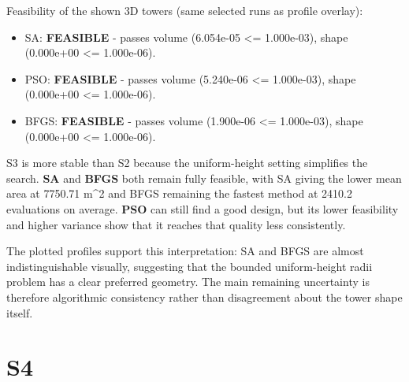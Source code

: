 Feasibility of the shown 3D towers (same selected runs as profile overlay):

\begin{itemize}
\item SA: \textbf{FEASIBLE} - passes volume (6.054e-05 <= 1.000e-03), shape (0.000e+00 <= 1.000e-06).
\item PSO: \textbf{FEASIBLE} - passes volume (5.240e-06 <= 1.000e-03), shape (0.000e+00 <= 1.000e-06).
\item BFGS: \textbf{FEASIBLE} - passes volume (1.900e-06 <= 1.000e-03), shape (0.000e+00 <= 1.000e-06).
\end{itemize}

S3 is more stable than S2 because the uniform-height setting simplifies the search. \textbf{SA} and \textbf{BFGS} both remain fully feasible, with SA giving the lower mean area at 7750.71 m\textasciicircum{}2 and BFGS remaining the fastest method at 2410.2 evaluations on average. \textbf{PSO} can still find a good design, but its lower feasibility and higher variance show that it reaches that quality less consistently.


The plotted profiles support this interpretation: SA and BFGS are almost indistinguishable visually, suggesting that the bounded uniform-height radii problem has a clear preferred geometry. The main remaining uncertainty is therefore algorithmic consistency rather than disagreement about the tower shape itself.



\section{S4}

\begin{table}[H]
\centering
\scriptsize
\setlength{\tabcolsep}{4pt}
\renewcommand{\arraystretch}{1.1}
\end{table}


